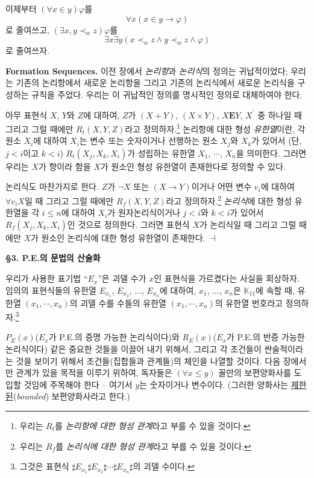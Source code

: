 \documentclass[12pt]{paper}
\newenvironment{context}[1][]
{ \noindent \textbf{{#1}.} }
{ \hfill $ \dashv $ }
\begin{document}
이제부터 $ \left( \forall x \in y \right) \varphi $를 $$ \forall x \left( x \in y \rightarrow \varphi \right) $$로 줄여쓰고,
$ \left( \exists x , y \prec_{w} z \right) \varphi$를 $$ \exists x \exists y \left( x \prec_{w} z \land y \prec_{w} z \land \varphi \right) $$로 줄여쓰자.

\begin{context}[Formation Sequences]
이전 장에서 \textit{논리항}과 \textit{논리식}의 정의는 귀납적이었다;
우리는 기존의 논리항에서 새로운 논리항을 그리고 기존의 논리식에서 새로운 논리식을 구성하는 규칙을 주었다.
우리는 이 귀납적인 정의를 명시적인 정의로 대체하여야 한다.

아무 표현식 $X$, $Y$와 $Z$에 대하여,
$Z$가 $\left( X + Y \right)$, $\left( X \times Y \right)$, $X \mathbf{E} Y$, $X^{\prime}$ 중 하나일 때 그리고 그럴 때에만
$R_t \left( X , Y , Z \right)$라고 정의하자.\footnote
{
우리는 $R_t$를 \textit{논리항에 대한 형성 관계}라고 부를 수 있을 것이다.
}
논리항에 대한 형성 \textit{유한열}이란, 각 원소 $X_{i}$에 대하여 $X_{i}$는 변수 또는 숫자이거나 선행하는 원소 $X_{j}$와 $X_{k}$가 있어서 (단, $j < i$이고 $k < i$) $R_t \left( X_{j}, X_{k}, X_{i} \right)$가 성립하는 유한열 $X_1$, $\cdots$, $X_n$을 의미한다.
그러면 우리는 $X$가 항이라 함을 $X$가 원소인 형성 유한열이 존재한다로 정의할 수 있다.

논리식도 마찬가지로 한다. $Z$가 $\lnot X$ 또는 $\left( X \to Y \right)$이거나 어떤 변수 $v_{i}$에 대하여 $\forall v_{i} X$일 때 그리고 그럴 때에만
$R_f \left( X , Y , Z \right)$라고 정의하자.\footnote
{
우리는 $R_f$를 \textit{논리식에 대한 형성 관계}라고 부를 수 있을 것이다.
}
\textit{논리식}에 대한 형성 유한열을 각 $i \le n$에 대하여 $X_{i}$가 원자논리식이거나 $j < i$와 $k < i$가 있어서 $R_f \left( X_{j} , X_{k} , X_{i} \right)$인 것으로 정의한다.
그러면 표현식 $X$가 논리식일 때 그리고 그럴 때에만 $X$가 원소인 논리식에 대한 형성 유한열이 존재한다.
\end{context}

\noindent \textbf{\S3. P.E.의 문법의 산술화}

우리가 사용한 표기법 ``$E_{x}$''은 괴델 수가 $x$인 표현식을 가르켰다는 사실을 회상하자.
임의의 표현식들의 유한열 $E_{x_1}$, $E_{x_2}$, ..., $E_{x_n}$에 대하여, $x_1$, ..., $x_n$은 $\mathbb{K}_{11}$에 속할 때,
유한열 $\left( x_{1}, \cdots, x_{n} \right)$의 괴델 수를 수들의 유한열 $\left( x_{1}, \cdots, x_{n} \right)$의 유한열 번호라고 정의하자.\footnote
{
그것은 표현식 $\sharp E_{x_1} \sharp E_{x_2} \sharp \cdots \sharp E_{x_n} \sharp$의 괴델 수이다.
}

$P_E \left( x \right)$($E_x$가 P.E.의 증명 가능한 논리식이다)와 $R_E \left( x \right)$($E_x$가 P.E.의 반증 가능한 논리식이다) 같은 중요한 것들을 이끌어 내기 위해서,
그리고 각 조건들이 싼술적이라는 것을 보이기 위해서 조건들(집합들과 관계들)의 체인을 나열할 것이다.
다음 장에서만 관계가 있을 목적을 이루기 위하여, 독자들은 $\left( \forall x \le y \right)$ 꼴만의 보편양화사를 도입할 것임에 주목해야 한다 -- 여기서 $y$는 숫자이거나 변수이다. (그러한 양화사는 \underline{제한된}(\textit{bounded}) 보편양화사라고 한다.)
\end{document}

